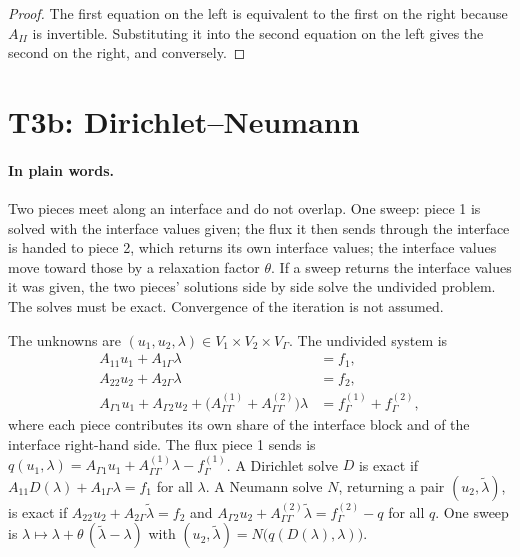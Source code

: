 \begin{proof}
  \leanok
  The first equation on the left is equivalent to the first on the right
  because $A_{II}$ is invertible.  Substituting it into the second equation on
  the left gives the second on the right, and conversely.
\end{proof}

\section{T3b: Dirichlet--Neumann}

\paragraph{In plain words.}
Two pieces meet along an interface and do not overlap.  One sweep: piece 1 is
solved with the interface values given; the flux it then sends through the
interface is handed to piece 2, which returns its own interface values; the
interface values move toward those by a relaxation factor $\theta$.  If a sweep
returns the interface values it was given, the two pieces' solutions side by
side solve the undivided problem.  The solves must be exact.  Convergence of
the iteration is not assumed.

\begin{definition}\label{def:two-pieces}
  \leanok
  The unknowns are $(u_1,u_2,\lambda)\in V_1\times V_2\times V_\Gamma$.  The
  undivided system is
  \begin{align*}
    A_{11}u_1+A_{1\Gamma}\lambda&=f_1,\\
    A_{22}u_2+A_{2\Gamma}\lambda&=f_2,\\
    A_{\Gamma1}u_1+A_{\Gamma2}u_2
      +\bigl(A^{(1)}_{\Gamma\Gamma}+A^{(2)}_{\Gamma\Gamma}\bigr)\lambda
      &=f^{(1)}_\Gamma+f^{(2)}_\Gamma ,
  \end{align*}
  where each piece contributes its own share of the interface block and of the
  interface right-hand side.  The flux piece 1 sends is
  $q(u_1,\lambda)=A_{\Gamma1}u_1+A^{(1)}_{\Gamma\Gamma}\lambda-f^{(1)}_\Gamma$.
  A Dirichlet solve $D$ is exact if $A_{11}D(\lambda)+A_{1\Gamma}\lambda=f_1$
  for all $\lambda$.  A Neumann solve $N$, returning a pair
  $(u_2,\tilde\lambda)$, is exact if
  $A_{22}u_2+A_{2\Gamma}\tilde\lambda=f_2$ and
  $A_{\Gamma2}u_2+A^{(2)}_{\Gamma\Gamma}\tilde\lambda=f^{(2)}_\Gamma-q$ for all
  $q$.  One sweep is
  $\lambda\mapsto\lambda+\theta\,(\tilde\lambda-\lambda)$ with
  $(u_2,\tilde\lambda)=N\bigl(q(D(\lambda),\lambda)\bigr)$.
\end{definition}

